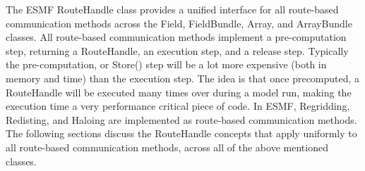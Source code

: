 %

\label{sec:RHandle}

The ESMF RouteHandle class provides a unified interface for all route-based communication methods across the Field, FieldBundle, Array, and ArrayBundle classes. All route-based communication methods implement a pre-computation step, returning a RouteHandle, an execution step, and a release step. Typically the pre-computation, or Store() step will be a lot more expensive (both in memory and time) than the execution step. The idea is that once precomputed, a RouteHandle will be executed many times over during a model run, making the execution time a very performance critical piece of code. In ESMF, Regridding, Redisting, and Haloing are implemented as route-based communication methods. The following sections discuss the RouteHandle concepts that apply uniformly to all route-based communication methods, across all of the above mentioned classes.





